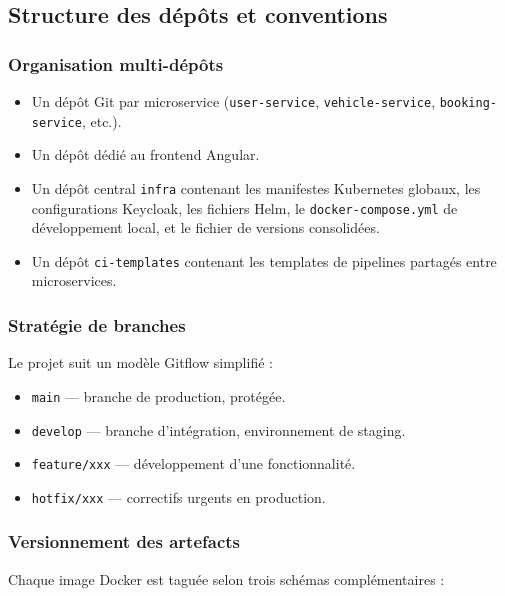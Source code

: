 \documentclass[12pt,a4paper]{article}
\begin{document}
\subsection{Structure des dépôts et conventions}

\subsubsection{Organisation multi-dépôts}

\begin{itemize}[leftmargin=*,itemsep=4pt]
    \item Un dépôt Git par microservice (\texttt{user-service}, \texttt{vehicle-service}, \texttt{booking-service}, etc.).
    \item Un dépôt dédié au frontend Angular.
    \item Un dépôt central \texttt{infra} contenant les manifestes Kubernetes globaux, les configurations Keycloak, les fichiers Helm, le \texttt{docker-compose.yml} de développement local, et le fichier de versions consolidées.
    \item Un dépôt \texttt{ci-templates} contenant les templates de pipelines partagés entre microservices.
\end{itemize}

\subsubsection{Stratégie de branches}

Le projet suit un modèle Gitflow simplifié :

\begin{itemize}[leftmargin=*,itemsep=4pt]
    \item \texttt{main} --- branche de production, protégée.
    \item \texttt{develop} --- branche d'intégration, environnement de staging.
    \item \texttt{feature/xxx} --- développement d'une fonctionnalité.
    \item \texttt{hotfix/xxx} --- correctifs urgents en production.
\end{itemize}

\subsubsection{Versionnement des artefacts}

Chaque image Docker est taguée selon trois schémas complémentaires :
\end{document}
